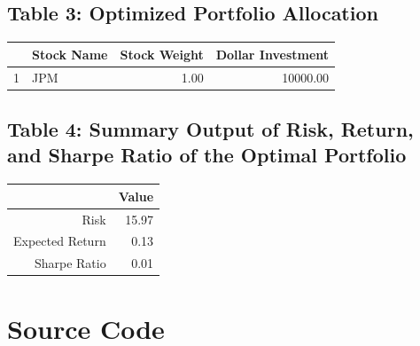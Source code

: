 \documentclass[12pt,english]{article}
\begin{document}
        \subsection{Table 3: Optimized Portfolio Allocation}
                \begin{table}[ht]
                \centering
                \begin{tabular}{rlrr}
                  \hline
                 & Stock Name & Stock Weight & Dollar Investment \\ 
                  \hline
                1 & JPM & 1.00 & 10000.00 \\ 
                   \hline
                \end{tabular}
                \end{table}
                
        \subsection{Table 4: Summary Output of Risk, Return, and Sharpe Ratio of the Optimal Portfolio}
                \begin{table}[ht]
                \centering
                \begin{tabular}{rr}
                  \hline
                 & Value \\ 
                  \hline
                Risk & 15.97 \\ 
                  Expected Return & 0.13 \\ 
                  Sharpe Ratio & 0.01 \\ 
                   \hline
                \end{tabular}
                \end{table}
    
    \newpage\section{Source Code}
    
\end{document}
